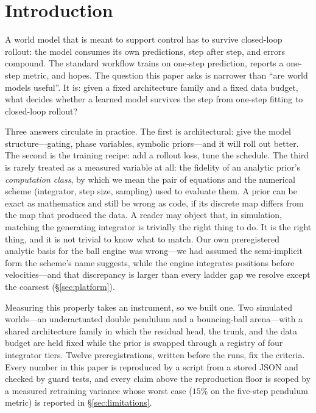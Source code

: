 \documentclass{article}
\begin{document}
\section{Introduction}

A world model that is meant to support control has to survive closed-loop rollout: the model consumes its own predictions, step after step, and errors compound. The standard workflow trains on one-step prediction, reports a one-step metric, and hopes. The question this paper asks is narrower than ``are world models useful''. It is: given a fixed architecture family and a fixed data budget, what decides whether a learned model survives the step from one-step fitting to closed-loop rollout?

Three answers circulate in practice. The first is architectural: give the model structure---gating, phase variables, symbolic priors---and it will roll out better. The second is the training recipe: add a rollout loss, tune the schedule. The third is rarely treated as a measured variable at all: the fidelity of an analytic prior's \emph{computation class}, by which we mean the pair of equations and the numerical scheme (integrator, step size, sampling) used to evaluate them. A prior can be exact as mathematics and still be wrong as code, if its discrete map differs from the map that produced the data. A reader may object that, in simulation, matching the generating integrator is trivially the right thing to do. It is the right thing, and it is not trivial to know what to match. Our own preregistered analytic basis for the ball engine was wrong---we had assumed the semi-implicit form the scheme's name suggests, while the engine integrates positions before velocities---and that discrepancy is larger than every ladder gap we resolve except the coarsest (\S\ref{sec:platform}).

Measuring this properly takes an instrument, so we built one. Two simulated worlds---an underactuated double pendulum and a bouncing-ball arena---with a shared architecture family in which the residual head, the trunk, and the data budget are held fixed while the prior is swapped through a registry of four integrator tiers. Twelve preregistrations, written before the runs, fix the criteria. Every number in this paper is reproduced by a script from a stored JSON and checked by guard tests, and every claim above the reproduction floor is scoped by a measured retraining variance whose worst case ($15\%$ on the five-step pendulum metric) is reported in \S\ref{sec:limitations}.
\end{document}
